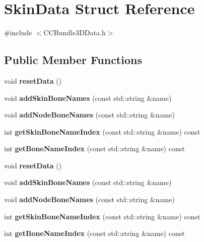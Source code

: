 \hypertarget{structSkinData}{}\section{Skin\+Data Struct Reference}
\label{structSkinData}


{\ttfamily \#include $<$C\+C\+Bundle3\+D\+Data.\+h$>$}

\subsection*{Public Member Functions}
\begin{DoxyCompactItemize}
\item 
\mbox{\label{structSkinData_a0dd41dd98e0da1f2380468d573c9d751}} 
void {\bfseries reset\+Data} ()
\item 
\mbox{\label{structSkinData_a1b53083db82a7a30e2564ff9e4a15a2d}} 
void {\bfseries add\+Skin\+Bone\+Names} (const std\+::string \&name)
\item 
\mbox{\label{structSkinData_adfe70f094072cf5707a18f9f1b27fb29}} 
void {\bfseries add\+Node\+Bone\+Names} (const std\+::string \&name)
\item 
\mbox{\label{structSkinData_ae465178785759eb37abb0d06299dfc23}} 
int {\bfseries get\+Skin\+Bone\+Name\+Index} (const std\+::string \&name) const
\item 
\mbox{\label{structSkinData_ab7523bdf315160897e73f4db40b3230e}} 
int {\bfseries get\+Bone\+Name\+Index} (const std\+::string \&name) const
\item 
\mbox{\label{structSkinData_a0dd41dd98e0da1f2380468d573c9d751}} 
void {\bfseries reset\+Data} ()
\item 
\mbox{\label{structSkinData_a1b53083db82a7a30e2564ff9e4a15a2d}} 
void {\bfseries add\+Skin\+Bone\+Names} (const std\+::string \&name)
\item 
\mbox{\label{structSkinData_adfe70f094072cf5707a18f9f1b27fb29}} 
void {\bfseries add\+Node\+Bone\+Names} (const std\+::string \&name)
\item 
\mbox{\label{structSkinData_ae465178785759eb37abb0d06299dfc23}} 
int {\bfseries get\+Skin\+Bone\+Name\+Index} (const std\+::string \&name) const
\item 
\mbox{\label{structSkinData_ab7523bdf315160897e73f4db40b3230e}} 
int {\bfseries get\+Bone\+Name\+Index} (const std\+::string \&name) const
\end{DoxyCompactItemize}
